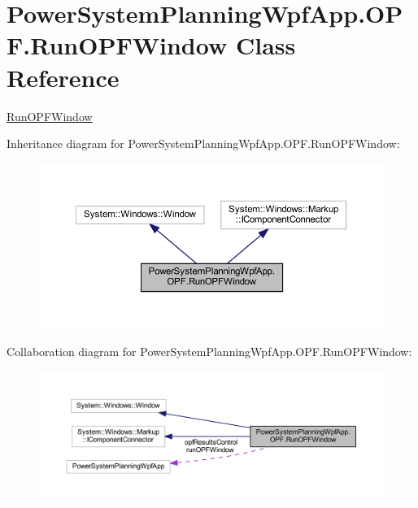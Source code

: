 \hypertarget{class_power_system_planning_wpf_app_1_1_o_p_f_1_1_run_o_p_f_window}{}\section{Power\+System\+Planning\+Wpf\+App.\+O\+P\+F.\+Run\+O\+P\+F\+Window Class Reference}
\label{class_power_system_planning_wpf_app_1_1_o_p_f_1_1_run_o_p_f_window}


\hyperlink{class_power_system_planning_wpf_app_1_1_o_p_f_1_1_run_o_p_f_window}{Run\+O\+P\+F\+Window}  




Inheritance diagram for Power\+System\+Planning\+Wpf\+App.\+O\+P\+F.\+Run\+O\+P\+F\+Window\+:\nopagebreak
\begin{figure}[H]
\begin{center}
\leavevmode
\includegraphics[width=350pt]{class_power_system_planning_wpf_app_1_1_o_p_f_1_1_run_o_p_f_window__inherit__graph}
\end{center}
\end{figure}


Collaboration diagram for Power\+System\+Planning\+Wpf\+App.\+O\+P\+F.\+Run\+O\+P\+F\+Window\+:\nopagebreak
\begin{figure}[H]
\begin{center}
\leavevmode
\includegraphics[width=350pt]{class_power_system_planning_wpf_app_1_1_o_p_f_1_1_run_o_p_f_window__coll__graph}
\end{center}
\end{figure}
